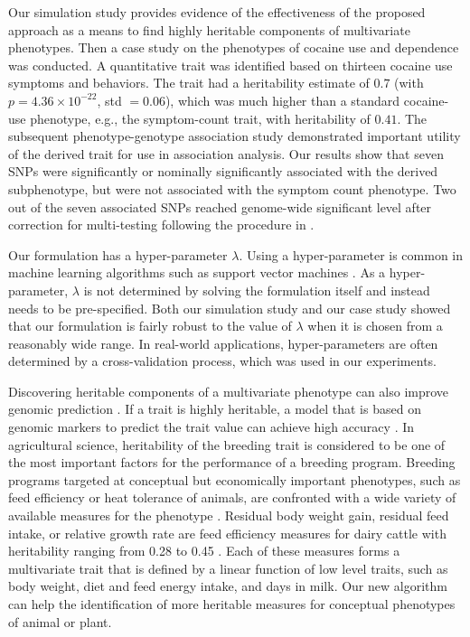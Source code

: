 \documentclass[10pt,letterpaper]{article}
\begin{document}
Our simulation study provides evidence of the effectiveness of the proposed approach as a means to find highly heritable components of multivariate phenotypes. Then a case study on the phenotypes of cocaine use and dependence was conducted. A quantitative trait was identified based on thirteen cocaine use symptoms and behaviors. The trait had a heritability estimate of $0.7$ (with $p=4.36\times 10^{-22}$, std $= 0.06$), which was much higher than a standard cocaine-use phenotype, e.g., the symptom-count trait, with heritability of $0.41$. The subsequent phenotype-genotype association study demonstrated important utility of the derived trait for use in association analysis. Our results show that seven SNPs were significantly or nominally significantly associated with the derived subphenotype, but were not associated with the symptom count phenotype. Two out of the seven associated SNPs reached genome-wide significant level after correction for multi-testing following the procedure in \cite{muli:test:crt:li:2012,Gelernter:CD:2014}. 

Our formulation has a hyper-parameter $\lambda$. Using a hyper-parameter is common in machine learning algorithms such as support vector machines \cite{vapnik:1998}. As a hyper-parameter, $\lambda$ is not determined by solving the formulation itself and instead needs to be pre-specified. Both our simulation study and our case study showed that our formulation is fairly robust to the value of $\lambda$ when it is chosen from a reasonably wide range. In real-world applications, hyper-parameters are often determined by a cross-validation process, which was used in our experiments. 

Discovering heritable components of a multivariate phenotype can also improve genomic prediction \cite{deloCampos:2010}. If a trait is highly heritable, a model that is based on genomic markers to predict the trait value can achieve high accuracy \cite{deLosCampos:2013}.  In agricultural science, heritability of the breeding trait is considered to be one of the most important factors for the performance of a breeding program.  Breeding programs targeted at conceptual but economically important phenotypes, such as feed efficiency or heat tolerance of animals, are confronted with a wide variety of available measures for the phenotype \cite{Connor:feedefficiency:2012,boligon:2011}. Residual body weight gain, residual feed intake, or relative growth rate are feed efficiency measures for dairy cattle with heritability ranging from 0.28 to 0.45 \cite{berry:2012,Connor:feedefficiency:2012}. Each of these measures forms a multivariate trait that is defined by a linear function of low level traits, such as body weight, diet and feed energy intake, and days in milk. Our new algorithm can help the identification of more heritable measures for conceptual phenotypes of animal or plant.  
\end{document}
